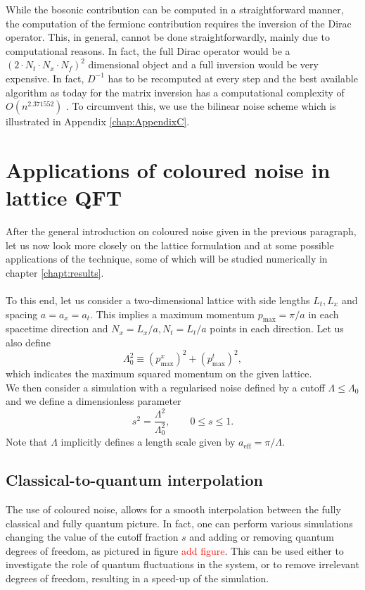 While the bosonic contribution can be computed in a straightforward manner, the computation of the fermionc contribution requires the inversion of the Dirac operator. This, in general, cannot be done straightforwardly, mainly due to computational reasons.
In fact, the full Dirac operator would be a $(2 \cdot N_t \cdot N_x \cdot N_f)^2$ dimensional object and a full inversion would be very expensive. In fact, $D^{-1}$ has to be recomputed at every step and the best available algorithm as today for the matrix inversion has a computational complexity of $O(n^{2.371552})$ \cite{williams2023new}. To circumvent this, we use the bilinear noise scheme \cite{bilinearnoise1,bilinearnoise2} which is illustrated in Appendix \ref{chap:AppendixC}.

\newpage


\section{Applications of coloured noise in lattice QFT}
\label{sec:lattice_with_coloured_noise}
After the general introduction on coloured noise given in the previous paragraph, let us now look more closely on the lattice formulation and at some possible applications of the technique, some of which will be studied numerically in chapter \ref{chapt:results}. \\~\\
To this end, let us consider a two-dimensional lattice with side lengths $L_t, L_x$ and spacing $a = a_x = a_t$. This implies a maximum momentum $p_\text{max} = \pi / a$ in each spacetime direction and $N_x=L_x/a, N_t=L_t/a$ points in each direction. Let us also define 
\begin{equation}
	\Lambda_0^2 \equiv (p^x_\text{max})^2 + (p^t_\text{max})^2,
\end{equation}
which indicates the maximum squared momentum on the given lattice. \\
We then consider a simulation with a regularised noise defined by a cutoff $\Lambda \leq \Lambda_0$ and we define a dimensionless parameter
\begin{equation}
	s^2 = \frac{\Lambda^2}{\Lambda_0^2}, \qquad 0 \leq s \leq 1.
\end{equation}
Note that $\Lambda$ implicitly defines a length scale given by  $a_\text{eff} = \pi/\Lambda$.\\


\subsection{Classical-to-quantum interpolation}
The use of coloured noise, allows for a smooth interpolation between the fully classical and fully quantum picture. In fact, one can perform various simulations changing the value of the cutoff fraction $s$ and adding or removing quantum degrees of freedom, as pictured in figure \textcolor{red}{add figure}. This can be used either to investigate the role 
of quantum fluctuations in the system, or to remove irrelevant degrees of freedom, resulting in a speed-up of the simulation.

